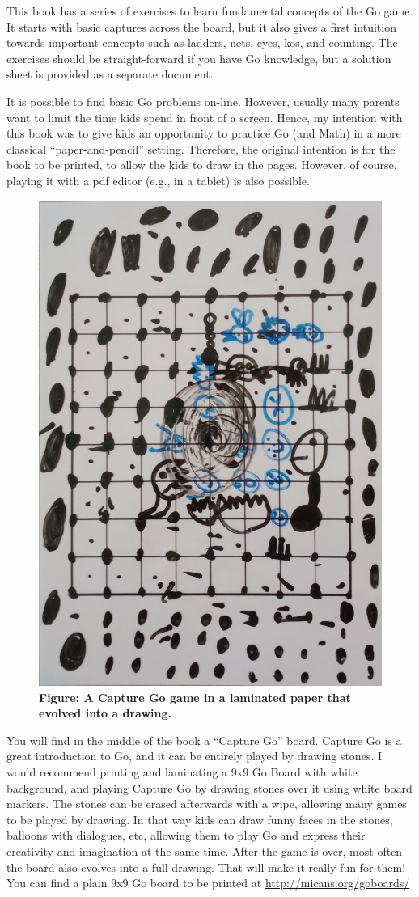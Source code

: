 \documentclass[a4paper,12pt]{extarticle}
\begin{document}
This book has a series of exercises to learn fundamental concepts of the Go game. It starts with basic captures across the board, but it also gives a first intuition towards important concepts such as ladders, nets, eyes, kos, and counting. The exercises should be straight-forward if you have Go knowledge, but a solution sheet is provided as a separate document.

It is possible to find basic Go problems on-line. However, usually many parents want to limit the time kids spend in front of a screen. Hence, my intention with this book was to give kids an opportunity to practice Go (and Math) in a more classical ``paper-and-pencil'' setting. Therefore, the original intention is for the book to be printed, to allow the kids to draw in the pages. However, of course, playing it with a pdf editor (e.g., in a tablet) is also possible.

\begin{figure}
  \includegraphics[width=0.35\columnwidth]{imgs/captureGo.jpg}\\
  \textbf{Figure: A Capture Go game in a laminated paper that evolved into a drawing.}
\end{figure}

You will find in the middle of the book a ``Capture Go'' board. Capture Go is a great introduction to Go, and it can be entirely played by drawing stones. I would recommend printing and laminating a 9x9 Go Board with white background, and playing Capture Go by drawing stones over it using white board markers. The stones can be erased afterwards with a wipe, allowing many games to be played by drawing. In that way kids can draw funny faces in the stones, balloons with dialogues, etc, allowing them to play Go and express their creativity and imagination at the same time. After the game is over, most often the board also evolves into a full drawing. That will make it really fun for them! You can find a plain 9x9 Go board to be printed at \url{http://micans.org/goboards/}
\end{document}
